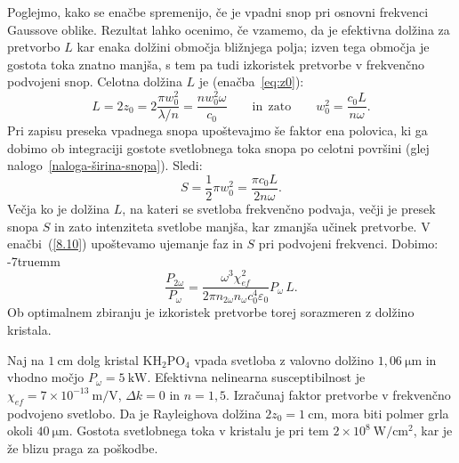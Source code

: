 Poglejmo, kako se enačbe spremenijo, če je vpadni snop pri osnovni 
frekvenci Gaussove oblike. 
Rezultat lahko ocenimo, če vzamemo, da je
efektivna dolžina za pretvorbo $L$ kar enaka dolžini območja bližnjega polja; izven tega območja je 
gostota toka znatno manjša, s tem pa tudi izkoristek pretvorbe v 
frekvenčno podvojeni snop.
Celotna  dolžina $L$ je (enačba~\ref{eq:z0}):
\begin{equation}
L=2z_{0}=2\frac{\pi w_{0}^{2}}{\lambda/n} = \frac{n w_0^2 \omega}{c_0}  \qquad \mathrm{in~~zato} \qquad 
w_{0}^{2} = \frac{c_0 L}{n \omega}.
\label{SHGG}
\end{equation}
Pri zapisu preseka vpadnega snopa upoštevajmo še faktor ena polovica, ki ga 
dobimo ob integraciji gostote svetlobnega toka
snopa po celotni površini (glej nalogo~\ref{naloga-širina-snopa}). Sledi:
\begin{equation}
S=\frac{1}{2}\pi w_{0}^{2} = \frac{\pi c_0 L}{2 n \omega}.
\end{equation}
Večja ko je dolžina $L$, na kateri se svetloba frekvenčno podvaja, 
večji je presek snopa $S$ in zato intenziteta svetlobe manjša, kar zmanjša
učinek pretvorbe.
V enačbi~(\ref{8.10}) upoštevamo ujemanje faz in $S$ pri podvojeni frekvenci. Dobimo:
\vglue-7truemm
\begin{equation}
\frac{P_{2\omega}}{P_{\omega}}=
\frac{\omega^3 \chi_{ef}^2}{2\pi n_{2\omega} n_\omega c_0^4\varepsilon_0} P_\omega\, L.
\label{8.17}
\end{equation}
Ob optimalnem zbiranju je izkoristek pretvorbe torej sorazmeren z dolžino kristala.
\begin{naloga}
Naj na $1~\si{\centi\metre}$ dolg kristal KH$_{2}$PO$_{4}$ vpada svetloba
z valovno dolžino $1,06~\si{\micro\metre}$ in vhodno močjo $P_\omega = 5~\si{\kilo\watt}$.
Efektivna nelinearna susceptibilnost je $\chi_{ef}=7\times 10^{-13}~\si{\metre/\volt}$, 
$\Delta k=0$ in $n=1,5$. Izračunaj
faktor pretvorbe v frekvenčno podvojeno svetlobo.
Da je Rayleighova dolžina $2z_{0}=1~\si{\centi\metre}$, mora biti polmer
grla okoli $40~\si{\micro\metre}$. Gostota svetlobnega toka v kristalu je pri
tem $2\times 10^{8}~\si{\watt/\centi\metre^{2}}$, kar je že blizu praga za poškodbe. 
\end{naloga}


